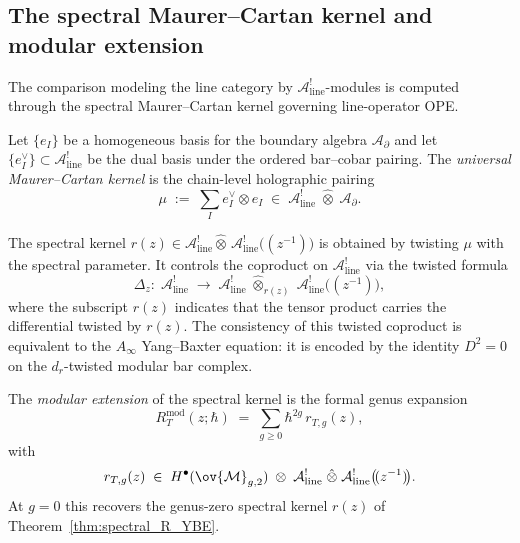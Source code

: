 \subsection{The spectral Maurer--Cartan kernel and modular extension}
\label{subsec:spectral-mc-kernel}

The comparison modeling the line category by
$\mathcal{A}^!_{\mathrm{line}}$-modules is computed through the
spectral Maurer--Cartan kernel governing line-operator OPE.

\begin{definition}
\label{def:universal-mc-kernel}
Let $\{e_I\}$ be a homogeneous basis for the boundary algebra $\mathcal{A}_\partial$ and
let $\{e_I^\vee\} \subset \mathcal{A}^!_{\mathrm{line}}$ be the dual basis under the ordered
bar--cobar pairing.
The \emph{universal Maurer--Cartan kernel} is the chain-level holographic pairing
\begin{equation}
\label{eq:mc-kernel}
\mu \;:=\; \sum_I e_I^\vee \otimes e_I
\;\in\;
\mathcal{A}^!_{\mathrm{line}} \;\hat\otimes\; \mathcal{A}_\partial.
\end{equation}
\end{definition}

The spectral kernel
$r(z) \in \mathcal{A}^!_{\mathrm{line}} \hat\otimes\, \mathcal{A}^!_{\mathrm{line}}\bigl(\!(z^{-1})\!\bigr)$
is obtained by twisting $\mu$ with the spectral parameter. It controls the coproduct on
$\mathcal{A}^!_{\mathrm{line}}$ via the twisted formula
\begin{equation}
\label{eq:twisted-coproduct}
\Delta_z:\; \mathcal{A}^!_{\mathrm{line}}
\;\longrightarrow\;
\mathcal{A}^!_{\mathrm{line}}
\;\hat\otimes_{r(z)}\;
\mathcal{A}^!_{\mathrm{line}}\bigl(\!(z^{-1})\!\bigr),
\end{equation}
where the subscript $r(z)$ indicates that the tensor product carries the differential
twisted by $r(z)$. The consistency of this twisted coproduct is equivalent to the
$A_\infty$ Yang--Baxter equation: it is encoded by the identity $D^2 = 0$ on the
$d_r$-twisted modular bar complex.

\begin{definition}
\label{def:modular-spectral-kernel}
The \emph{modular extension} of the spectral kernel is the formal genus expansion
\begin{equation}
\label{eq:modular-spectral-kernel}
R_T^{\mathrm{mod}}(z;\hbar)
\;=\;
\sum_{g \geq 0} \hbar^{2g}\, r_{T,g}(z),
\end{equation}
with
\[
r_{T,g}(z)
\;\in\;
H^\bullet(\ov{\mathcal{M}}_{g,2})
\;\otimes\;
\mathcal{A}^!_{\mathrm{line}}
\;\hat\otimes\;
\mathcal{A}^!_{\mathrm{line}}\bigl(\!(z^{-1})\!\bigr).
\]
At $g=0$ this recovers the genus-zero spectral kernel
$r(z)$ of Theorem~\ref{thm:spectral_R_YBE}.
\end{definition}

